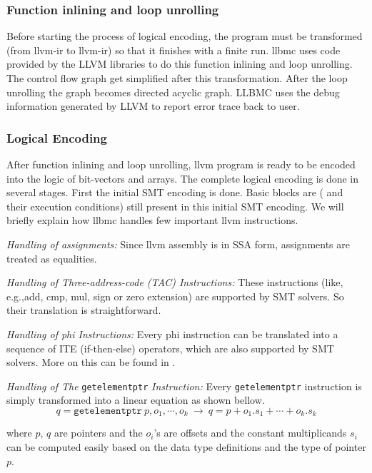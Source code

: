 \documentclass[14pt]{article}
\begin{document}
\subsubsection{Function inlining and loop unrolling} 
Before starting the process of logical encoding, the program must be transformed (from llvm-ir to llvm-ir) so that it finishes with a finite run. llbmc uses code provided by the LLVM libraries to do this function inlining and loop unrolling. The control flow graph get simplified after this transformation. After the loop unrolling the graph becomes directed acyclic graph. LLBMC uses the debug information generated by LLVM to report error trace back to user.

\subsubsection{Logical Encoding}\label{Logical Encoding}
After function inlining and loop unrolling, llvm program is ready to be encoded into the logic of bit-vectors and arrays. The complete logical encoding is done in several stages. First the initial SMT encoding is done. Basic blocks are ( and their execution conditions) still present in this initial SMT encoding.  We will briefly explain how llbmc handles few important llvm instructions.
\par \textit{Handling of assignments:} Since llvm assembly is in SSA form, assignments are treated as equalities.
\par \textit{Handling of Three-address-code (TAC) Instructions:}  These instructions (like, e.g.,add, cmp, mul, sign or zero extension) are supported by SMT solvers. So their translation is straightforward.
\par \textit{Handling of phi Instructions:} Every phi instruction can be translated into a sequence of ITE (if-then-else) operators, which are also supported by SMT solvers. More on this can be found in \cite{llbmc2}.
\par \textit{Handling of The }\texttt{getelementptr}  \textit{Instruction:} Every \texttt{getelementptr}  instruction is simply transformed into a linear equation as shown bellow.
\[q = \texttt{getelementptr} \  p, o_1, \cdots , o_k \   \rightarrow  \   q = p + o_1 . s_1 + \cdots  + o_k .s_k \] 

where \(p\), \(q\) are pointers and the \(o_i\)'s are offsets and the constant multiplicands \(s_i\) can be computed easily based on the
data type definitions and the type of pointer \(p\).
\end{document}

